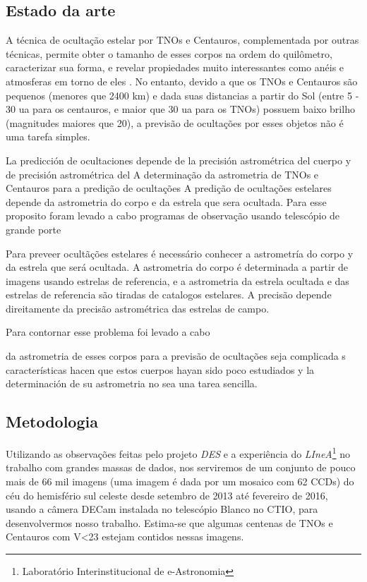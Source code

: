 \documentclass[a4paper, 11pt]{article}
\begin{document}
\subsection{Estado da arte}

A técnica de ocultação estelar por TNOs e Centauros, complementada por outras técnicas, permite obter o tamanho de esses corpos na ordem do quilômetro, caracterizar sua forma, e revelar propiedades muito interessantes como anéis \citep{2017Natur.550..219O, 2014AGUFM.P43F..01B} e atmosferas em torno de eles \citep{1538-3881-136-5-1757, 2006Natur.439...52S}. No entanto, devido a que os TNOs e Centauros são pequenos (menores que 2400 km) e dada suas distancias a partir do Sol (entre  5 - 30 ua para os centauros, e maior que 30 ua para os TNOs) possuem baixo brilho (magnitudes maiores que 20), a previsão de ocultações por esses objetos não é uma tarefa simples. 

La predicción de ocultaciones depende de la precisión astrométrica del cuerpo y de precisión astrométrica del
A determinação da astrometria de TNOs e Centauros para a predição de ocultações  
A predição de ocultações estelares depende da astrometria do corpo e da estrela que sera ocultada. Para esse proposito foram levado a cabo programas de observação usando telescópio de grande porte 

Para preveer ocultãções estelares é necessário conhecer a astrometría do corpo y da estrela que será ocultada. A astrometria do corpo é determinada a partir de imagens usando estrelas de referencia, e a astrometria da estrela ocultada e das estrelas de referencia são tiradas de catalogos estelares. A precisão depende direitamente da precisão astrométrica das estrelas de campo.





Para contornar esse problema foi levado a cabo


  da astrometria de esses corpos para a previsão de ocultações seja complicada s características hacen que estos cuerpos hayan sido poco estudiados y la determinación de su astrometria no sea una tarea sencilla. 

\subsection{Metodologia}

Utilizando as observa\c{c}\~oes feitas pelo projeto \textit{DES} e a experi\^encia do \textit{LIneA}\footnote{Laborat\'orio Interinstitucional de e-Astronomia} no trabalho com grandes massas de dados, nos serviremos de um conjunto de pouco mais de 66 mil imagens (uma imagem \'e dada por um mosaico com 62 CCDs) do c\'eu do hemisf\'erio sul celeste desde setembro de 2013 at\'e fevereiro de 2016, usando a c\^amera DECam instalada no telescópio Blanco no CTIO, para desenvolvermos nosso trabalho. Estima-se que algumas centenas de TNOs e Centauros com V<23 estejam contidos nessas imagens.
\end{document}
